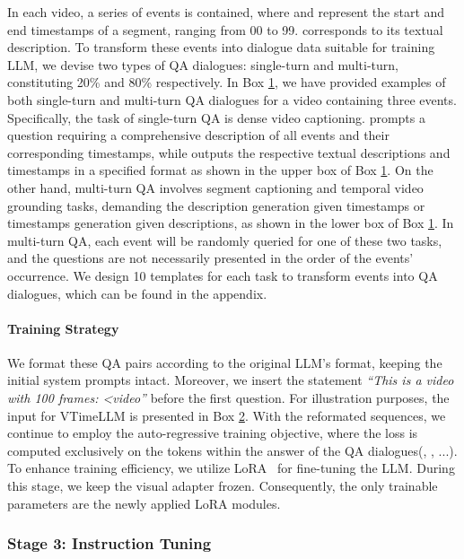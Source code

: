 \documentclass[10pt,twocolumn,letterpaper]{article}
\begin{document}
In each video, a series of events  is contained, where  and  represent the start and end timestamps of a segment, ranging from 00 to 99.  corresponds to its textual description. To transform these events into dialogue data  suitable for training LLM, we devise two types of QA dialogues: single-turn and multi-turn, constituting 20\% and 80\% respectively. In Box \hyperlink{box1}{1}, we have provided examples of both single-turn and multi-turn QA dialogues for a video containing three events. Specifically, the task of single-turn QA is dense video captioning.  prompts a question requiring a comprehensive description of all events and their corresponding timestamps, while  outputs the respective textual descriptions and timestamps in a specified format as shown in the upper box of Box \hyperlink{box1}{1}. On the other hand, multi-turn QA involves segment captioning and temporal video grounding tasks, demanding the description generation given timestamps or timestamps generation given descriptions, as shown in the lower box of Box \hyperlink{box1}{1}. In multi-turn QA, each event will be randomly queried for one of these two tasks, and the questions are not necessarily presented in the order of the events' occurrence. We design 10 templates for each task to transform events into QA dialogues, which can be found in the appendix.


\paragraph{Training Strategy} We format these QA pairs according to the original LLM's format, keeping the initial system prompts intact. Moreover, we insert the statement \textit{``This is a video with 100 frames: \textless video\textgreatern''} before the first question. For illustration purposes, the input for VTimeLLM is presented in Box \hyperlink{box2}{2}. With the reformated sequences, we continue to employ the auto-regressive training objective, where the loss is computed exclusively on the tokens within the answer of the QA dialogues(, , ...). To enhance training efficiency, we utilize LoRA~\cite{hu2021lora} for fine-tuning the LLM. During this stage, we keep the visual adapter  frozen. Consequently, the only trainable parameters are the newly applied LoRA modules.

\subsubsection{Stage 3: Instruction Tuning}
\end{document}
